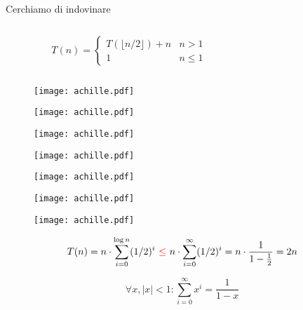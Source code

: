 \begin{frame}[shrink=5]{Cerchiamo di indovinare}

\vspace{-6pt}
\begin{mybox}
\begin{columns}[c]
\begin{column}{0.46\textwidth}
\[
T(n) = \begin{cases}
      T( \lfloor n/2 \rfloor )  + n & n > 1 \\
     1 & n \leq 1
  \end{cases}
\]
\end{column}
\begin{column}{0.51\textwidth}
\end{column}
\end{columns}
\end{mybox}


\begin{overprint}
\begin{figure}
	\texttt{[image: achille.pdf]}
\end{figure}
\begin{figure}
	\texttt{[image: achille.pdf]}
\end{figure}
\begin{figure}
	\texttt{[image: achille.pdf]}
\end{figure}
\begin{figure}
	\texttt{[image: achille.pdf]}
\end{figure}
\begin{figure}
	\texttt{[image: achille.pdf]}
\end{figure}
\begin{figure}
	\texttt{[image: achille.pdf]}
\end{figure}
\begin{figure}
	\texttt{[image: achille.pdf]}
\end{figure}
\[
  T(n) =    {n \cdot \sum_{i=0}^{ \log n } (1/2)^i}
       ~\textcolor{red}{\leq}~ {n \cdot \sum_{i=0}^{\infty} (1/2)^i}
       = {n \cdot \frac{1}{1-\frac{1}{2}} = 2n}
\]

\begin{myboxtitle}
\[
 \forall x, |x|<1: \sum_{i=0}^{\infty} x^i = \frac{1}{1-x}
\]
\end{myboxtitle}
\end{overprint}
\end{frame}





